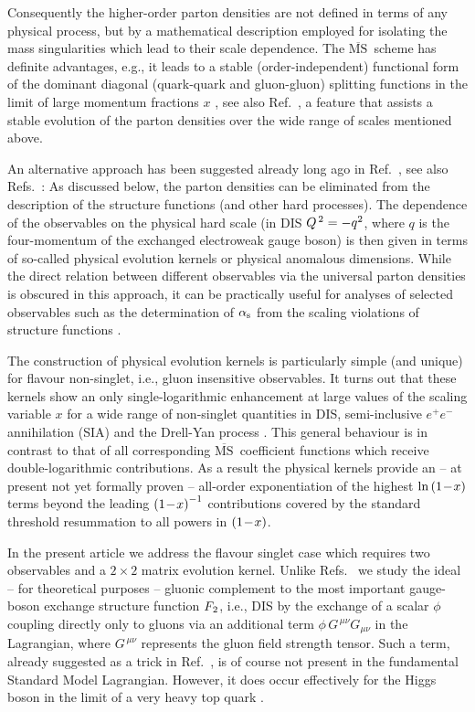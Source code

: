 \documentclass[12pt]{article}
\newcommand{\MSb}{$\overline{\mbox{MS}}$}
\newcommand{\as}{\alpha_{\rm s}}
\begin{document}
Consequently the higher-order parton densities are not defined in terms of any 
physical process, but by a mathematical description employed for isolating the
mass singularities which lead to their scale dependence. The \MSb\ scheme has 
definite advantages, e.g., it leads to a stable (order-independent) functional
form of the dominant diagonal (quark-quark and gluon-gluon) splitting functions
in the limit of large momentum fractions $x$ \cite{Korchemsky:1989si}, see also
Ref.~\cite{DMS05}, a feature that assists a stable evolution of the parton 
densities over the wide range of scales mentioned above. 

An alternative approach has been suggested already long ago in 
Ref.~\cite{FP82}, see also Refs.~\cite{physanom}:
As discussed below, the parton densities can be eliminated from the description
of the structure functions (and other hard processes). The dependence of the 
observables on the physical hard scale (in DIS ${Q^{\, 2}} = -q^2$, where $q$ is the 
four-momentum of the exchanged electroweak gauge boson) is then given in terms 
of so-called physical evolution kernels or physical anomalous dimensions.
% 
While the direct relation between different observables via the universal 
parton densities is obscured in this approach, it can be practically useful 
for analyses of selected observables such as the determination of $\as$ 
from the scaling violations of structure functions \cite{Vogt:1999ik}.

The construction of physical evolution kernels is particularly simple (and 
unique) for flavour non-singlet, i.e., gluon insensitive observables. It turns 
out that these kernels show an only single-logarithmic enhancement at large 
values of the scaling variable $x$ for a wide range of non-singlet quantities 
in DIS, semi-inclusive $e^+e^-$ annihilation (SIA) and the Drell-Yan process 
\cite{MV3,MV5}.
This general behaviour is in contrast to that of all corresponding \MSb\ 
coefficient functions which receive double-logarithmic contributions. As a
result the physical kernels provide an -- at present not yet formally proven
-- all-order exponentiation of the highest $\ln \x1$ terms beyond the leading 
$\x1^{-1}$ contributions covered by the standard threshold resummation
\cite{SoftGlue} to all powers in $\x1$. 

In the present article we address the flavour singlet case which requires two
observables and a $2\!\times\! 2$ matrix evolution kernel. Unlike Refs.~\cite
{physanom,Vogt:1999ik} we study the ideal -- for theoretical purposes -- 
gluonic complement to the most important gauge-boson exchange structure 
function ${F_{\:\! 2}}$, i.e., DIS by the exchange of a scalar $\phi$ coupling 
directly only to gluons via an additional term $\phi\,G^{\,\mu\nu\!}G_{\mu\nu}$
in the Lagrangian, where $G^{\,\mu\nu}$ represents the gluon field strength 
tensor. Such a term, already suggested as a trick in Ref.~\cite{FP82}, is of 
course not present in the fundamental Standard Model Lagrangian. However, it 
does occur effectively for the Higgs boson in the limit of a very heavy top 
quark \cite{HGGeff}. 
 
\end{document}
